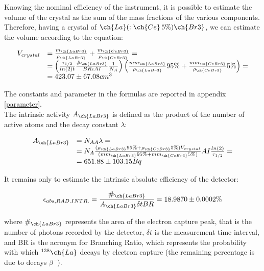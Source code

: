 \documentclass[a4paper,twoside,openany]{book}
\begin{document}
Knowing the nominal efficiency of the instrument, it is possible to estimate the volume of the crystal as the sum of the mass fractions of the various components. Therefore, having a crystal of $\ch{La}(:\ch{Ce}\,5\%)\ch{Br3}$, we can estimate the volume according to the equation:

\begin{equation}
 \begin{array}{ll}
V_{crystal} & =\frac{m_{\ch{LaBr3}}}{\rho_{\ch{LaBr3}}}+\frac{m_{\ch{CeBr3}}}{\rho_{\ch{CeBr3}}}=\\
\null & =\left(\frac{\tau_{1/2}}{ln(2)t}\frac{\#_{\ch{LaBr3}}}{BR\epsilon AI}\frac{1}{N_{A}}\right)\left(\frac{mm_{\ch{LaBr3}}}{\rho_{\ch{LaBr3}}}95\%+\frac{mm_{\ch{CeBr3}}}{\rho_{\ch{CeBr3}}}5\%\right) =\\
\null & = 423.07 \pm 67.08 cm^{3}
\end{array}
\label{volume}
 \end {equation}

The constants and parameter in the formulas are reported in appendix \ref{parameter}.\\
The intrinsic activity $A_{\ch{LaBr3}}$ is defined as the product of the number of active  atoms and the decay constant $\lambda$:
 
\begin{equation}
\begin{array}{ll}
A_{\ch{LaBr3}} & =N_{AA}\lambda=\\
\null & =N_A\frac{(\rho_{\ch{LaBr3}}95\%+\rho_{\ch{CeBr3}}5\%)V_{crystal}}{(mm_{\ch{LaBr3}}95\%+mm_{\ch{CeBr3}}5\%)}AI\frac{ln(2)}{\tau_{1/2}} =\\
\null & = 651.88 \pm 103.15 Bq
\end{array}
\label{attivita}
\end {equation}

It remains only to estimate the intrinsic absolute efficiency of the detector:

\begin{equation}
\epsilon_{abs, RAD.INTR.}=\frac{\#_{\ch{LaBr3}}}{A_{\ch{LaBr3}}\delta tBR} = 18.9870\pm0.0002\%
\label{eff_int}
\end {equation}

where $\#_{\ch{LaBr3}}$ represents the area of the electron capture peak, that is the number of photons recorded by the detector, $\delta t$ is the measurement time interval, and BR is the acronym for Branching Ratio, which represents the probability with which $^{138}\ch{La}$ decays by electron capture (the remaining percentage is due to decays $\beta^{-}$).
\end{document}
